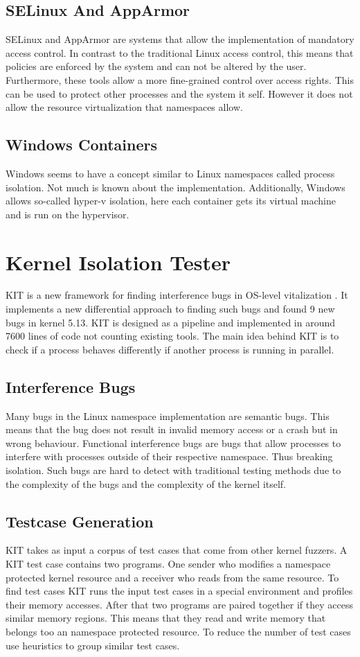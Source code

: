 \documentclass[10pt,twocolumn,a4paper]{article}
\begin{document}
\subsection{SELinux And AppArmor}
SELinux and AppArmor are systems that allow the implementation of mandatory access control. In
contrast to the traditional Linux access control, this means that policies are enforced by the system
and can not be altered by the user. Furthermore, these tools allow a more fine-grained control over
access rights. This can be used  to protect other processes and the system it self. However it does not allow the resource
virtualization that namespaces allow\cite{26}\cite{27}. 
\subsection{Windows Containers}
Windows seems to have a concept similar to Linux namespaces called process isolation. Not much is known about the
implementation. Additionally, Windows allows so-called hyper-v isolation, here each container
gets its virtual machine and is run on the hypervisor\cite{3}.

\section{Kernel Isolation Tester}
KIT is a new framework for finding interference bugs in OS-level vitalization \cite{0}. 
It implements a new differential approach to finding such bugs and found 9 new bugs in kernel 5.13\cite{2}.
KIT is designed as a pipeline and implemented in around 7600 lines of code not counting existing tools\cite{0}.
The main idea behind KIT is to check if a process behaves differently if another process is running
in parallel.

\subsection{Interference Bugs}
Many bugs in the Linux namespace implementation are semantic bugs.
This means that the bug does not result in invalid memory access or a crash but in wrong behaviour. 
Functional interference bugs are bugs that allow processes to interfere with processes outside of their respective namespace.
Thus breaking isolation. Such bugs are hard to detect with traditional testing methods due to the complexity of the bugs and the complexity of the kernel itself. 

\subsection{Testcase Generation}
KIT takes as input a corpus of test cases that come from other kernel fuzzers.
A KIT test case contains two programs. One sender who modifies a namespace protected kernel
resource and a receiver who reads from the same resource. To find test cases KIT runs the input test cases in a special environment and profiles their memory accesses. 
After that two programs are paired together if they access similar memory regions. 
This means that they read and write  memory that belongs too an namespace protected resource.
To reduce the number of test cases use heuristics to group similar test cases.
\end{document}
